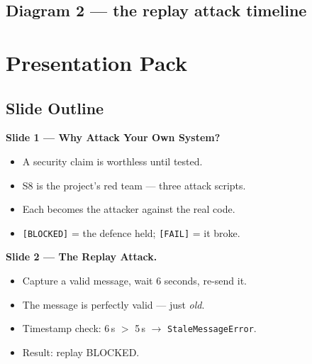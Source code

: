 \documentclass[11pt,a4paper]{report}
\begin{document}
\subsection{Diagram 2 --- the replay attack timeline}
\begin{center}
\end{center}

\section{Presentation Pack}

\subsection{Slide Outline}

\textbf{Slide 1 --- Why Attack Your Own System?}
\begin{itemize}
  \item A security claim is worthless until tested.
  \item S8 is the project's red team --- three attack scripts.
  \item Each becomes the attacker against the real code.
  \item \texttt{[BLOCKED]} = the defence held; \texttt{[FAIL]} = it broke.
\end{itemize}

\textbf{Slide 2 --- The Replay Attack.}
\begin{itemize}
  \item Capture a valid message, wait 6 seconds, re-send it.
  \item The message is perfectly valid --- just \emph{old}.
  \item Timestamp check: 6\,s $>$ 5\,s $\to$ \texttt{StaleMessageError}.
  \item Result: replay BLOCKED.
\end{itemize}
\end{document}
